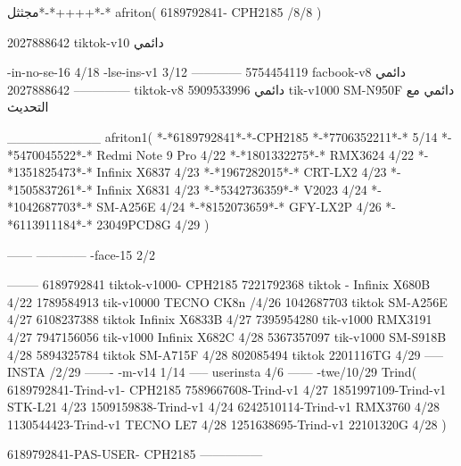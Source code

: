 مجثثل*-*++++*-*
afriton(
6189792841- CPH2185  /8/8
)

2027888642 tiktok-v10
دائمي

-in-no-se-16 4/18
-lse-ins-v1 3/12
------------
5754454119 facbook-v8
دائمي
--------------
2027888642 tiktok-v8
دائمي
5909533996 tik-v1000  SM-N950F
دائمي مع التحديث

__________
afriton1(
*-*6189792841*-*-CPH2185
*-*7706352211*-* 5/14
*-*5470045522*-* Redmi Note 9 Pro 4/22
*-*1801332275*-* RMX3624 4/22
*-*1351825473*-* Infinix X6837 4/23
*-*1967282015*-* CRT-LX2 4/23
*-*1505837261*-* Infinix X6831 4/23
*-*5342736359*-* V2023 4/24
*-*1042687703*-* SM-A256E 4/24
*-*8152073659*-* GFY-LX2P 4/26
*-*6113911184*-* 23049PCD8G 4/29
)


------
------------
-face-15 2/2

--------
6189792841 tiktok-v1000- CPH2185 
7221792368 tiktok - Infinix X680B  4/22 
1789584913 tik-v10000 TECNO CK8n /4/26
1042687703 tiktok SM-A256E 4/27
6108237388 tiktok  Infinix X6833B 4/27
7395954280 tik-v1000  RMX3191 4/27
7947156056 tik-v1000  Infinix X682C 4/28
5367357097 tik-v1000  SM-S918B 4/28
5894325784 tiktok SM-A715F  4/28
802085494 tiktok 2201116TG  4/29
-----
 INSTA /2/29
-------
-m-v14 1/14
-----
userinsta 4/6
------
-twe/10/29
Trind(
6189792841-Trind-v1- CPH2185 
7589667608-Trind-v1  4/27
1851997109-Trind-v1 STK-L21 4/23
1509159838-Trind-v1  4/24
6242510114-Trind-v1 RMX3760 4/28
1130544423-Trind-v1 TECNO LE7 4/28
1251638695-Trind-v1 22101320G 4/28
)

6189792841-PAS-USER- CPH2185 
    ---------------
